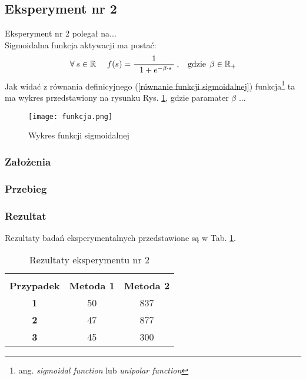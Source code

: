 \documentclass[12pt]{article}
\begin{document}

\newpage
\subsection{Eksperyment nr 2}

Eksperyment nr 2 polegał na...\\
Sigmoidalna funkcja aktywacji ma postać:
\begin{equation}
 \forall\: s \in \mathbb{R}\:\:\:\:\:\: f(s) = \frac{1}{\:\:\:1 + e^{-\beta \cdot s}\:}\:,
 \:\:\:\:\textnormal{gdzie}\:\:\beta \in \mathbb{R}_{+}
 \label{równanie funkcji sigmoidalnej}
\end{equation}
Jak widać z równania definicyjnego (\ref{równanie funkcji sigmoidalnej}) 
funkcja\footnote{ang. \textit{sigmoidal function} lub \textit{unipolar function}}
ta ma wykres przedstawiony 
na rysunku Rys. \ref{funkcja sigmoidalna}, gdzie paramater $\beta$ ...
\begin{figure}[h!]
 \centering
 \texttt{[image: funkcja.png]}
 \vspace{-0.1cm}
 \caption{Wykres funkcji sigmoidalnej}
 \label{funkcja sigmoidalna}
\end{figure}

\subsubsection{Założenia}

\subsubsection{Przebieg}

\subsubsection{Rezultat}

Rezultaty badań eksperymentalnych przedstawione są w Tab. \ref{wyniki eksperymentu drugiego}.
\vspace{-0.5cm}
\begin{table}[h!]
 \caption{Rezultaty eksperymentu nr 2}
 \centering
 \vspace{0.2cm}
 \begin{tabular}{c c c }
  \hline\hline\\[-0.4cm]
  \textbf{Przypadek} & \textbf{Metoda 1} & \textbf{Metoda 2}\\[0.1cm]
  \hline
  \textbf{1} & 50 & 837 \\
  \textbf{2} & 47 & 877 \\
  \textbf{3} & 45 & 300 \\ [0.1cm]
  \hline
 \end{tabular}
 \label{wyniki eksperymentu drugiego}
\end{table}
\end{document}
